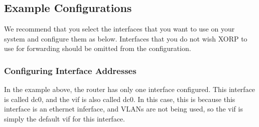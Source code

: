 \subsection{Example Configurations}

We recommend that you select the interfaces that you want to use on
your system and configure them as below.  Interfaces that you do not
wish XORP to use for forwarding should be omitted from the
configuration.

\subsubsection{Configuring Interface Addresses}

\vspace{0.1in}
\noindent{}

\vspace{0.1in}
In the example above, the router has only one interface configured.
This interface is called {\stt dc0}, and the vif is also called {\stt
dc0}.  In this case, this is because this interface is an ethernet
inferface, and VLANs are not being used, so the vif is simply the
default vif for this interface.  

